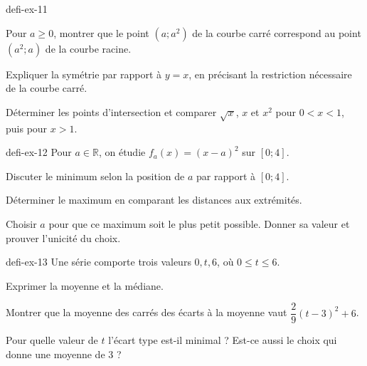 \begin{blocEdition}{defi-ex-11}
\begin{questions}
\item Pour $a\ge0$, montrer que le point $(a;a^2)$ de la courbe carré correspond au point $(a^2;a)$ de la courbe racine.
\item Expliquer la symétrie par rapport à $y=x$, en précisant la restriction nécessaire de la courbe carré.
\item Déterminer les points d’intersection et comparer $\sqrt x$, $x$ et $x^2$ pour $0<x<1$, puis pour $x>1$.
\end{questions}\label{fig-defi-ex-11}

\end{blocEdition}
\begin{blocEdition}{defi-ex-12}
Pour $a\in\mathbb R$, on étudie $f_a(x)=(x-a)^2$ sur $[0;4]$.\begin{questions}
\item Discuter le minimum selon la position de $a$ par rapport à $[0;4]$.
\item Déterminer le maximum en comparant les distances aux extrémités.
\item Choisir $a$ pour que ce maximum soit le plus petit possible. Donner sa valeur et prouver l’unicité du choix.
\end{questions}
\end{blocEdition}
\begin{blocEdition}{defi-ex-13}
Une série comporte trois valeurs $0,t,6$, où $0\le t\le6$.\begin{questions}
\item Exprimer la moyenne et la médiane.
\item Montrer que la moyenne des carrés des écarts à la moyenne vaut $\dfrac29(t-3)^2+6$.
\item Pour quelle valeur de $t$ l’écart type est-il minimal ? Est-ce aussi le choix qui donne une moyenne de 3 ?
\end{questions}
\end{blocEdition}
